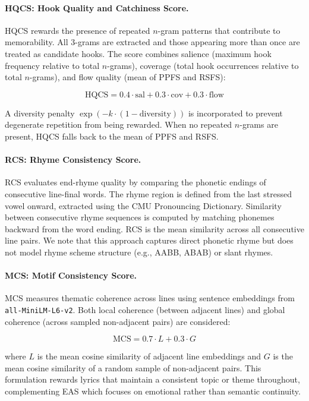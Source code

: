 \documentclass[11pt]{article}
\begin{document}
\paragraph{HQCS: Hook Quality and Catchiness Score.}
HQCS rewards the presence of repeated $n$-gram patterns that contribute to 
memorability. All 3-grams are extracted and those appearing more than once are 
treated as candidate hooks. The score combines salience (maximum hook frequency 
relative to total $n$-grams), coverage (total hook occurrences relative to 
total $n$-grams), and flow quality (mean of PPFS and RSFS):

\begin{equation}
\text{HQCS} = 0.4 \cdot \text{sal} + 0.3 \cdot \text{cov} + 0.3 \cdot \text{flow}
\end{equation}

A diversity penalty $\exp(-k \cdot (1 - \text{diversity}))$ is incorporated 
to prevent degenerate repetition from being rewarded. When no repeated $n$-grams 
are present, HQCS falls back to the mean of PPFS and RSFS.

\paragraph{RCS: Rhyme Consistency Score.}
RCS evaluates end-rhyme quality by comparing the phonetic endings of 
consecutive line-final words. The rhyme region is defined from the last 
stressed vowel onward, extracted using the CMU Pronouncing Dictionary. 
Similarity between consecutive rhyme sequences is computed by matching 
phonemes backward from the word ending. RCS is the mean similarity across 
all consecutive line pairs. We note that this approach captures direct 
phonetic rhyme but does not model rhyme scheme structure (e.g., AABB, ABAB) 
or slant rhymes.

\paragraph{MCS: Motif Consistency Score.}
MCS measures thematic coherence across lines using sentence embeddings from 
\texttt{all-MiniLM-L6-v2}. Both local coherence (between adjacent lines) and 
global coherence (across sampled non-adjacent pairs) are considered:

\begin{equation}
\text{MCS} = 0.7 \cdot L + 0.3 \cdot G
\end{equation}

where $L$ is the mean cosine similarity of adjacent line embeddings and $G$ 
is the mean cosine similarity of a random sample of non-adjacent pairs. 
This formulation rewards lyrics that maintain a consistent topic or theme 
throughout, complementing EAS which focuses on emotional rather than 
semantic continuity.
\end{document}
